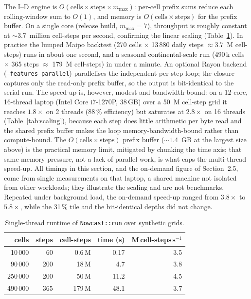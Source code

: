 \documentclass[authoryear,preprint,review,12pt]{elsarticle}
\begin{document}
The I--D engine is $O(\mathrm{cells}\times\mathrm{steps}\times m_{\max})$: per-cell
prefix sums reduce each rolling-window sum to $O(1)$, and memory is
$O(\mathrm{cells}\times\mathrm{steps})$ for the prefix buffer. On a single core
(release build, $m_{\max}=7$), throughput is roughly constant at
${\sim}3.7$~million cell-steps per second, confirming the linear scaling
(Table~\ref{tab:perf}). In practice the lumped Maipo backtest (270 cells $\times$
13\,880 daily steps $\approx 3.7$~M cell-steps) runs in about one second, and a
seasonal continental-scale run (490\,k cells $\times$ 365 steps $\approx$
179~M cell-steps) in under a minute. An optional Rayon backend
(\texttt{--features parallel}) parallelises the independent per-step loop; the
closure captures only the read-only prefix buffer, so the output is bit-identical
to the serial run. The speed-up is, however, modest and bandwidth-bound: on a
12-core, 16-thread laptop (Intel Core i7-1270P, 38\,GB) over a 50~M cell-step grid it reaches $1.8\times$ on 2 threads
(88\,\% efficiency) but saturates at $2.8\times$ on 16 threads
(Table~\ref{tab:scaling}), because each step does little arithmetic per byte read
and the shared prefix buffer makes the loop memory-bandwidth-bound rather than
compute-bound. The $O(\mathrm{cells}\times\mathrm{steps})$ prefix buffer
(${\sim}1.4$~GB at the largest size above) is the practical memory limit,
mitigated by chunking the time axis; that same memory pressure, not a lack of
parallel work, is what caps the multi-thread speed-up. All timings in this section,
and the on-demand figure of Section~2.5, come from single measurements on that
laptop, a shared machine not isolated from other workloads; they illustrate the
scaling and are not benchmarks. Repeated under background load, the on-demand
speed-up ranged from $3.8\times$ to $5.8\times$, while the 31\,\% tile and the
bit-identical depths did not change.

\begin{table}[ht]
\centering
\caption{Single-thread runtime of \texttt{Nowcast::run} over synthetic grids.}
\label{tab:perf}
\begin{tabular}{@{}rrrrr@{}}
\toprule
cells & steps & cell-steps & time (s) & M\,cell-steps\,s$^{-1}$ \\
\midrule
10\,000  & 60  & 0.6\,M   & 0.17  & 3.5 \\
90\,000  & 200 & 18\,M    & 4.7   & 3.8 \\
250\,000 & 200 & 50\,M    & 11.2  & 4.5 \\
490\,000 & 365 & 179\,M   & 48.1  & 3.7 \\
\bottomrule
\end{tabular}
\end{table}
\end{document}
